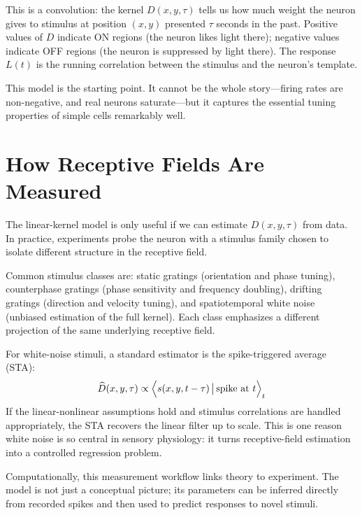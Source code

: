\noindent This is a convolution: the kernel $D(x, y, \tau)$ tells us how much weight the neuron gives to stimulus at position $(x, y)$ presented $\tau$ seconds in the past. Positive values of $D$ indicate ON regions (the neuron likes light there); negative values indicate OFF regions (the neuron is suppressed by light there). The response $L(t)$ is the running correlation between the stimulus and the neuron's template.

This model is the starting point. It cannot be the whole story---firing rates are non-negative, and real neurons saturate---but it captures the essential tuning properties of simple cells remarkably well.

\section{How Receptive Fields Are Measured}
\label{sec:rf-measurement}

The linear-kernel model is only useful if we can estimate $D(x,y,\tau)$ from data. In practice, experiments probe the neuron with a stimulus family chosen to isolate different structure in the receptive field.

Common stimulus classes are: static gratings (orientation and phase tuning), counterphase gratings (phase sensitivity and frequency doubling), drifting gratings (direction and velocity tuning), and spatiotemporal white noise (unbiased estimation of the full kernel). Each class emphasizes a different projection of the same underlying receptive field.

For white-noise stimuli, a standard estimator is the spike-triggered average (STA):
%
\begin{equation}
  \widehat{D}(x,y,\tau) \propto
  \Bigl\langle s(x,y,t-\tau)\,\big|\,\text{spike at }t\Bigr\rangle_t
  \label{eq:sta}
\end{equation}
%
If the linear-nonlinear assumptions hold and stimulus correlations are handled appropriately, the STA recovers the linear filter up to scale. This is one reason white noise is so central in sensory physiology: it turns receptive-field estimation into a controlled regression problem.

Computationally, this measurement workflow links theory to experiment. The model is not just a conceptual picture; its parameters can be inferred directly from recorded spikes and then used to predict responses to novel stimuli.

